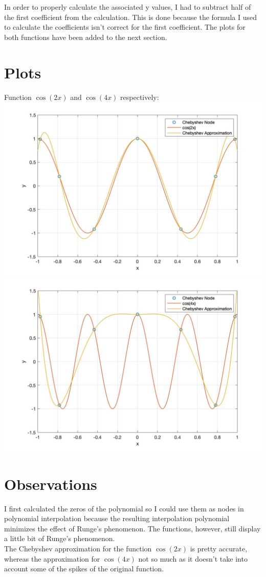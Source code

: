 \documentclass{article}
\begin{document}
In order to properly calculate the associated y values, I had to subtract half of the first coefficient from the calculation. This is done because the formula I used to calculate the coefficients isn't correct for the first coefficient. The plots for both functions have been added to the next section.\\

\section{Plots}
Function $\cos(2x)$ and $\cos(4x)$ respectively:\\
\includegraphics[width=\textwidth,height=\textheight,keepaspectratio]{cos2x.jpg}\\
\includegraphics[width=\textwidth,height=\textheight,keepaspectratio]{cos4x.jpg}
\section{Observations}
I first calculated the zeros of the polynomial so I could use them as nodes in polynomial interpolation because the resulting interpolation polynomial minimizes the effect of Runge's phenomenon. The functions, however, still display a little bit of Runge's phenomenon. \\

The Chebyshev approximation for the function $\cos(2x)$ is pretty accurate, whereas the approximation for $\cos(4x)$ not so much as it doesn't take into account some of the spikes of the original function.
\end{document}
